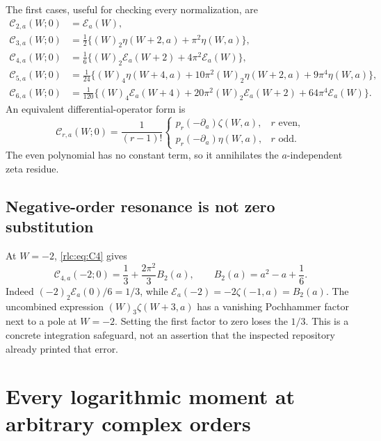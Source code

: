 \documentclass[11pt,a4paper]{article}
\numberwithin{equation}{section}
\theoremstyle{definition}\newtheorem{definition}[theorem]{Definition}
\theoremstyle{remark}\newtheorem{remark}[theorem]{Remark}
\newcommand{\E}{\mathcal E}
\newcommand{\CC}{\mathcal C}
\begin{document}
The first cases, useful for checking every normalization, are
\begin{align}
 \CC_{2,a}(W;0)&=\E_a(W),\label{rlc:eq:C2}\\
 \CC_{3,a}(W;0)&=\tfrac12\{(W)_2\eta(W+2,a)+\pi^2\eta(W,a)\},
 \label{rlc:eq:C3}\\
 \CC_{4,a}(W;0)&=\tfrac16\{(W)_2\E_a(W+2)+4\pi^2\E_a(W)\},
 \label{rlc:eq:C4}\\
 \CC_{5,a}(W;0)&=\tfrac1{24}\{(W)_4\eta(W+4,a)
                +10\pi^2(W)_2\eta(W+2,a)+9\pi^4\eta(W,a)\},
 \label{rlc:eq:C5}\\
 \CC_{6,a}(W;0)&=\tfrac1{120}\{(W)_4\E_a(W+4)
                +20\pi^2(W)_2\E_a(W+2)+64\pi^4\E_a(W)\}.
 \label{rlc:eq:C6}
\end{align}
An equivalent differential-operator form is
\begin{equation}\label{rlc:eq:shiftoperator}
 \CC_{r,a}(W;0)=\frac1{(r-1)!}
 \begin{cases}
 p_r(-\partial_a)\zeta(W,a),&r\text{ even},\\
 p_r(-\partial_a)\eta(W,a),&r\text{ odd}.
 \end{cases}
\end{equation}
The even polynomial has no constant term, so it annihilates the
$a$-independent zeta residue.

\subsection{Negative-order resonance is not zero substitution}
At $W=-2$, \eqref{rlc:eq:C4} gives
\begin{equation}\label{rlc:eq:resonance}
 \boxed{\displaystyle
 \CC_{4,a}(-2;0)=\frac13+\frac{2\pi^2}{3}B_2(a),
 \qquad B_2(a)=a^2-a+\frac16.}
\end{equation}
Indeed $(-2)_2\E_a(0)/6=1/3$, while
$\E_a(-2)=-2\zeta(-1,a)=B_2(a)$.
The uncombined expression $(W)_3\zeta(W+3,a)$ has a vanishing
Pochhammer factor next to a pole at $W=-2$. Setting the first factor to
zero loses the $1/3$. This is a concrete integration safeguard, not an
assertion that the inspected repository already printed that error.



\section{Every logarithmic moment at arbitrary complex orders}
\label{rlc:sec:moments}
\end{document}
